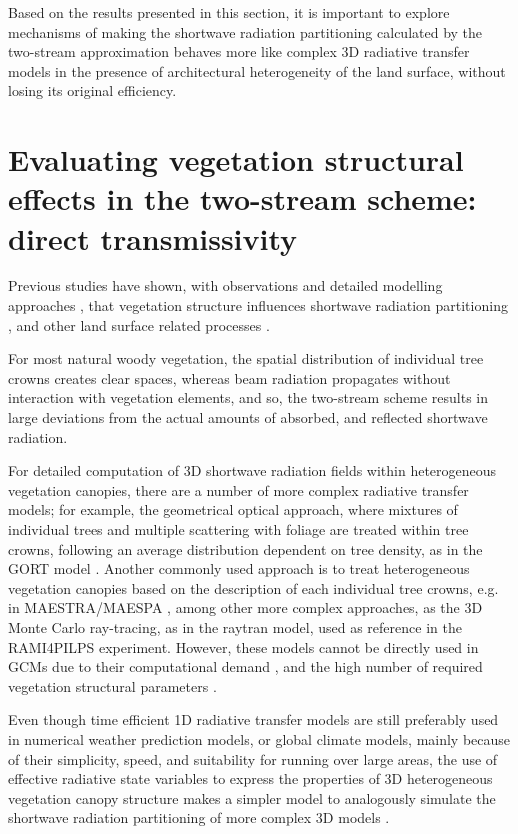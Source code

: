 Based on the results presented in this section, it is important to explore mechanisms of making the shortwave radiation partitioning calculated by the two-stream approximation behaves more like complex 3D radiative transfer models in the presence of architectural heterogeneity of the land surface, without losing its original efficiency.

\section{Evaluating vegetation structural effects in the two-stream scheme: direct transmissivity}\label{section:parameterisations}

Previous studies \citep{Nilson1971,Wang1990} have shown, with observations \citep{Kucharik1999,Yang2001,yang2003,Jonckheere2004} and detailed modelling approaches \citep{Ni-Meister2010,Widlowski2011}, that vegetation structure influences shortwave radiation partitioning \citep{pinty2006,Chen2008}, and other land surface related processes \citep{Kobayashi2012,loew2014}.

For most natural woody vegetation, the spatial distribution of individual tree crowns creates clear spaces, whereas beam radiation propagates without interaction with vegetation elements, and so, the two-stream scheme results in large deviations from the actual amounts of absorbed, and reflected shortwave radiation.

For detailed computation of 3D shortwave radiation fields within heterogeneous vegetation canopies, there are a number of more complex radiative transfer models; for example, the geometrical optical approach, where mixtures of individual trees and multiple scattering with foliage are treated within tree crowns, following an average distribution dependent on tree density, as in the GORT model \citep{Li1995}. Another commonly used approach is to treat heterogeneous vegetation canopies based on the description of each individual tree crowns, e.g. in MAESTRA/MAESPA \citep{Wang1990,Duursma2012}, among other more complex approaches, as the 3D Monte Carlo ray-tracing, as in the raytran model, used as reference in the RAMI4PILPS experiment. However, these models cannot be directly used in GCMs due to their computational demand \citep{Yang2001}, and the high number of required vegetation structural parameters \citep{loew2014}. 

Even though time efficient 1D radiative transfer models are still preferably used in numerical weather prediction models, or global climate models, mainly because of their simplicity, speed, and suitability for running over large areas, the use of effective radiative state variables to express the properties of 3D heterogeneous vegetation canopy structure makes a simpler model to analogously simulate the shortwave radiation partitioning of more complex 3D models \citep{Pinty2004,pinty2006}.

